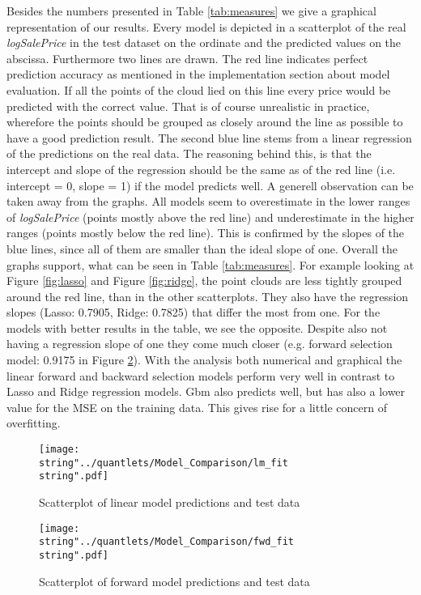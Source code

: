 Besides the numbers presented in Table \ref{tab:measures} we give a graphical representation of our results. Every model is depicted in a scatterplot of the real \textit{logSalePrice} in the test dataset on the ordinate and the predicted values on the abscissa. Furthermore two lines are drawn. The red line indicates perfect prediction accuracy as mentioned in the implementation section about model evaluation. If all the points of the cloud lied on this line every price would be predicted with the correct value. That is of course unrealistic in practice, wherefore the points should be grouped as closely around the line as possible to have a good prediction result. The second blue line stems from a linear regression of the predictions on the real data. The reasoning behind this, is that the intercept and slope of the regression should be the same as of the red line (i.e. intercept = 0, slope = 1) if the model predicts well. A generell observation can be taken away from the graphs. All models seem to overestimate in the lower ranges of \textit{logSalePrice} (points mostly above the red line) and underestimate in the higher ranges (points mostly below the red line). This is confirmed by the slopes of the blue lines, since all of them are smaller than the ideal slope of one. Overall the graphs support, what can be seen in Table \ref{tab:measures}. For example looking at Figure \ref{fig:lasso} and Figure \ref{fig:ridge}, the point clouds are less tightly grouped around the red line, than in the other scatterplots. They also have the regression slopes (Lasso: 0.7905, Ridge: 0.7825) that differ the most from one. For the models with better results in the table, we see the opposite. Despite also not having a regression slope of one they come much closer (e.g. forward selection model: 0.9175 in Figure \ref{fig:fwd}). With the analysis both numerical and graphical the linear forward and backward selection models perform very well in contrast to Lasso and Ridge regression models. Gbm also predicts well, but has also a lower value for the MSE on the training data. This gives rise for a little concern of overfitting.    




\begin{figure}[H]
\centering
	\texttt{[image: \\string"../quantlets/Model\_Comparison/lm\_fit\\string".pdf]}
  	\caption{Scatterplot of linear model predictions and test data}
  	\label{fig:lm}
\end{figure}

\begin{figure}[H]
\centering
	\texttt{[image: \\string"../quantlets/Model\_Comparison/fwd\_fit\\string".pdf]}
  	\caption{Scatterplot of forward model predictions and test data}
  	\label{fig:fwd}
\end{figure}

